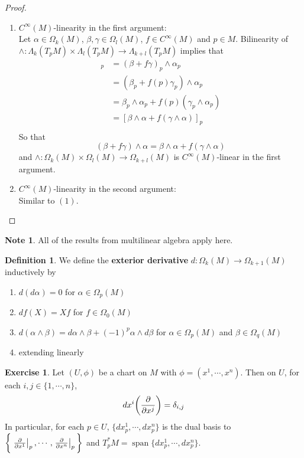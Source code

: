 \documentclass[12pt]{amsart}
\theoremstyle{definition}
\newtheorem{defn}[definition]{Definition}
\newtheorem{note}[definition]{Note}
\newtheorem{ex}[definition]{Exercise}
\newcommand{\al}{\alpha}
\newcommand{\gam}{\gamma}
\newcommand{\bet}{\beta}
\newcommand{\del}{\delta}
\newcommand{\Lam}{\Lambda}
\newcommand{\Om}{\Omega}
\DeclareMathOperator{\spn}{span}
\begin{document}
	\begin{proof}\
	\begin{enumerate}
	\item 
	$C^{\infty}(M)$-linearity in the first argument:\\
	Let $\al \in \Om_k(M)$, $\bet, \gam \in \Om_l(M)$, $f \in C^{\infty}(M)$ and $p \in M$. Bilinearity of $\wedge: \Lam_k(T_pM) \times \Lam_l(T_pM) \rightarrow \Lam_{k+l}(T_pM)$ implies that
	\begin{align*}
	[(\bet + f \gam ) \wedge \al]_p 
	&= (\bet + f \gam)_p \wedge \al_p  \\
	&=(\bet_p + f(p) \gam_p) \wedge \al_p \\
	&= \bet_p \wedge \al_p + f(p)( \gam_p \wedge \al_p) \\
	&=  [\bet \wedge \al + f (\gam \wedge \al)]_p \\
	\end{align*}
	So that $$(\bet + f \gam ) \wedge \al = \bet \wedge \al  + f  (\gam \wedge \al)$$ and $\wedge: \Om_k(M) \times \Om_l(M) \rightarrow \Om_{k+l}(M) $ is $C^{\infty}(M)$-linear in the first argument. 
	\item $C^{\infty}(M)$-linearity in the second argument:\\
	Similar to $(1)$.
	\end{enumerate}
	\end{proof}
	
	\begin{note}
		All of the results from multilinear algebra apply here.
	\end{note}

	\begin{defn}
		We define the \textbf{exterior derivative} $d: \Om_k(M) \rightarrow \Om_{k+1}(M)$ inductively by 
		\begin{enumerate}
			\item $d(d \al) = 0$ for $\al \in \Om_p(M)$
			\item $df(X) = Xf$ for $f \in \Om_0(M)$
			\item $d(\al \wedge \bet) = d\al \wedge \bet + (-1)^p \al \wedge d\bet$ for $\al \in \Om_p(M)$ and $\bet \in \Om_q(M)$
			\item extending linearly
		\end{enumerate}
	\end{defn}

	\begin{ex}
		Let $(U, \phi)$ be a chart on $M$ with $\phi = (x^1, \cdots, x^n)$. Then on $U$, for each $i,j \in \{1, \cdots, n\}$, $$dx^i\bigg(\pdv{x^j} \bigg) = \del_{i,j}$$ 
		In particular, for each $p \in U$, $\{dx^1_p, \cdots, dx^n_p \}$ is the dual basis to $\bigg \{ \eval{\pdv{x^1}}_{p}, \cdots, \eval{\pdv{x^n}}_{p} \bigg \}$ and $T_p^*M = \spn\{dx^1_p, \cdots, dx^n_p\}$.
	\end{ex}
\end{document}
